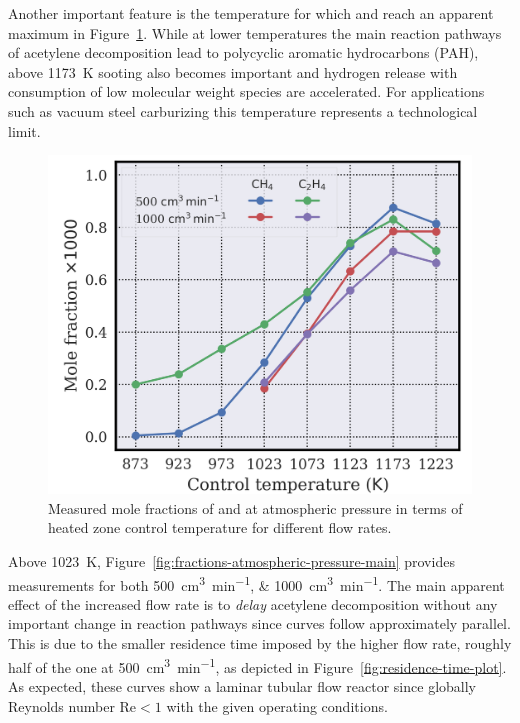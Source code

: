 \documentclass[final,3p,times,twocolumn,sort&compress]{elsarticle}
\newcommand{\sccm}{\cubic\centi\metre\per\minute}
\begin{document}
Another important feature is the temperature for which  and  reach an apparent maximum in Figure~\ref{fig:fractions-atmospheric-pressure-other}. While at lower temperatures the main reaction pathways of acetylene decomposition lead to polycyclic aromatic hydrocarbons (PAH), above \SI{1173}{\kelvin} sooting also becomes important and hydrogen release with consumption of low molecular weight species are accelerated. For applications such as vacuum steel carburizing this temperature represents a technological limit.

\begin{figure}[h]
	\centering
	\includegraphics[width=\linewidth]
	{figures/fractions_atmospheric_pressure_other}
	\caption{\label{fig:fractions-atmospheric-pressure-other}Measured mole fractions of  and  at atmospheric pressure in terms of heated zone control temperature for different flow rates.}
\end{figure}

Above \SI{1023}{\kelvin}, Figure~\ref{fig:fractions-atmospheric-pressure-main}  provides measurements for both \SIlist{500;1000}{\sccm}. The main apparent effect of the increased flow rate is to \emph{delay} acetylene decomposition without any important change in reaction pathways since curves follow approximately parallel. This is due to the smaller residence time imposed by the higher flow rate, roughly half of the one at \SI{500}{\sccm}, as depicted in Figure~\ref{fig:residence-time-plot}. As expected, these curves show a laminar tubular flow reactor since globally Reynolds number $\mathrm{Re}<1$ with the given operating conditions.
\end{document}
